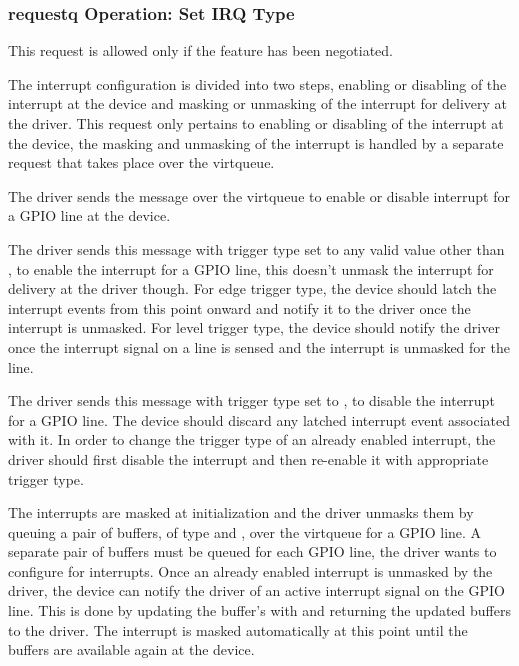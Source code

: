 \subsubsection{requestq Operation: Set IRQ Type}\label{sec:Device Types / GPIO Device / requestq Operation / Set IRQ Type}

This request is allowed only if the  feature has been
negotiated.

The interrupt configuration is divided into two steps, enabling or disabling of
the interrupt at the device and masking or unmasking of the interrupt for
delivery at the driver. This request only pertains to enabling or disabling of
the interrupt at the device, the masking and unmasking of the interrupt is
handled by a separate request that takes place over the 
virtqueue.

The driver sends the  message over the
 virtqueue to enable or disable interrupt for a GPIO line at
the device.

The driver sends this message with trigger type set to any valid value other
than , to enable the interrupt for a GPIO line,
this doesn't unmask the interrupt for delivery at the driver though. For edge
trigger type, the device should latch the interrupt events from this point
onward and notify it to the driver once the interrupt is unmasked. For level
trigger type, the device should notify the driver once the interrupt signal on a
line is sensed and the interrupt is unmasked for the line.

The driver sends this message with trigger type set to
, to disable the interrupt for a GPIO line. The
device should discard any latched interrupt event associated with it. In order
to change the trigger type of an already enabled interrupt, the driver should
first disable the interrupt and then re-enable it with appropriate trigger type.

The interrupts are masked at initialization and the driver unmasks them by
queuing a pair of buffers, of type  and
, over the  virtqueue for a GPIO
line. A separate pair of buffers must be queued for each GPIO line, the driver
wants to configure for interrupts. Once an already enabled interrupt is unmasked
by the driver, the device can notify the driver of an active interrupt signal on
the GPIO line. This is done by updating the  buffer's  with
 and returning the updated buffers to the
driver. The interrupt is masked automatically at this point until the buffers
are available again at the device.


